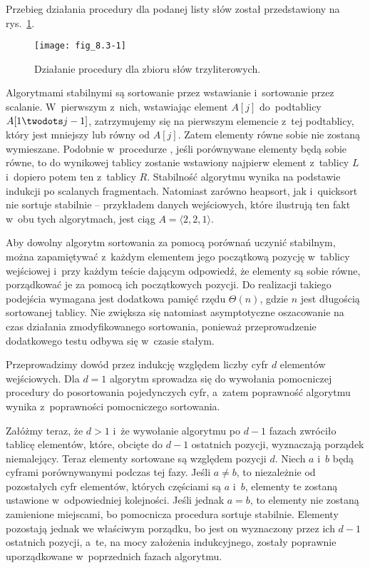 
\exercise %
Przebieg działania procedury  dla podanej listy słów został przedstawiony na rys.~\ref{fig:8.3-1}.
\begin{figure}[ht]
	\begin{center}
		\texttt{[image: fig\_8.3-1]}
	\end{center}
	\caption{Działanie procedury  dla zbioru słów trzyliterowych.} \label{fig:8.3-1}
\end{figure}

\exercise %
Algorytmami stabilnymi są sortowanie przez wstawianie i~sortowanie przez scalanie.
W~pierwszym z~nich, wstawiając element $A[j]$ do~podtablicy $A[1\twodots j-1]$, zatrzymujemy się na pierwszym elemencie z~tej podtablicy, który jest mniejszy lub równy od $A[j]$.
Zatem elementy równe sobie nie zostaną wymieszane.
Podobnie w~procedurze , jeśli porównywane elementy będą sobie równe, to do wynikowej tablicy zostanie wstawiony najpierw element z~tablicy $L$ i~dopiero potem ten z~tablicy $R$.
Stabilność algorytmu wynika na podstawie indukcji po scalanych fragmentach.
Natomiast zarówno heapsort, jak i~quicksort nie sortuje stabilnie -- przykładem danych wejściowych, które ilustrują ten fakt w~obu tych algorytmach, jest ciąg $A=\langle2,2,1\rangle$.

Aby dowolny algorytm sortowania za pomocą porównań uczynić stabilnym, można zapamiętywać z~każdym elementem jego początkową pozycję w~tablicy wejściowej i~przy każdym teście dającym odpowiedź, że elementy są sobie równe, porządkować je za pomocą ich początkowych pozycji.
Do realizacji takiego podejścia wymagana jest dodatkowa pamięć rzędu $\Theta(n)$, gdzie $n$ jest długością sortowanej tablicy.
Nie zwiększa się natomiast asymptotyczne oszacowanie na czas działania zmodyfikowanego sortowania, ponieważ przeprowadzenie dodatkowego testu odbywa się w~czasie stałym.

\exercise %
Przeprowadzimy dowód przez indukcję względem liczby cyfr $d$ elementów wejściowych.
Dla $d=1$ algorytm  sprowadza się do wywołania pomocniczej procedury do posortowania pojedynczych cyfr, a~zatem poprawność algorytmu wynika z~poprawności pomocniczego sortowania.

Załóżmy teraz, że $d>1$ i~że wywołanie algorytmu  po $d-1$ fazach zwróciło tablicę elementów, które, obcięte do $d-1$ ostatnich pozycji, wyznaczają porządek niemalejący.
Teraz elementy sortowane są względem pozycji $d$.
Niech $a$ i~$b$ będą cyframi porównywanymi podczas tej fazy.
Jeśli $a\ne b$, to niezależnie od pozostałych cyfr elementów, których częściami są $a$ i~$b$, elementy te zostaną ustawione w~odpowiedniej kolejności.
Jeśli jednak $a=b$, to elementy nie zostaną zamienione miejscami, bo pomocnicza procedura sortuje stabilnie.
Elementy pozostają jednak we właściwym porządku, bo jest on wyznaczony przez ich $d-1$ ostatnich pozycji, a~te, na mocy założenia indukcyjnego, zostały poprawnie uporządkowane w~poprzednich fazach algorytmu.

